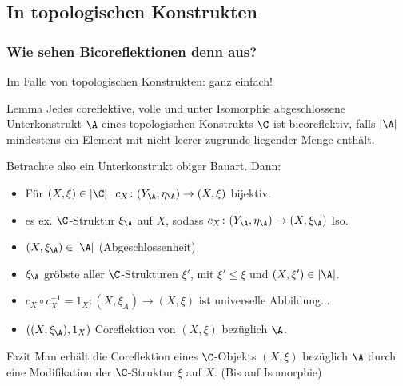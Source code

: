\subsection{In topologischen Konstrukten}

\begin{frame}
\frametitle{Wie sehen Bicoreflektionen denn aus?}

Im Falle von topologischen Konstrukten: ganz einfach!

  \pause

  \begin{block}{Lemma}
  Jedes coreflektive, volle und unter Isomorphie abgeschlossene Unterkonstrukt $\A$ eines topologischen Konstrukts $\C$ ist bicoreflektiv, falls $|\A|$ mindestens ein Element mit nicht leerer zugrunde liegender Menge enthält.
  \end{block}

  \pause
  Betrachte also ein Unterkonstrukt obiger Bauart. Dann:

  \begin{itemize}
    \item<+-> Für $(X, \xi) \in |\C|$: $c_X \colon (Y_\A, \eta_\A) \to (X, \xi)$ bijektiv.
    \item<+-> es ex. $\C$-Struktur $\xi_\A$ auf $X$, sodass $c_X \colon (Y_\A, \eta_\A) \to (X, \xi_\A)$ Iso.

    \item<+-> $(X, \xi_\A) \in |\A|$ (Abgeschlossenheit)
    \item<+-> $\xi_\A$ gröbste aller $\C$-Strukturen $\xi'$, mit $\xi' \leq \xi$ und $(X, \xi') \in |\A|$.

    \item<+->  $c_X \circ c_X^{-1} = 1_X \colon (X,\xi_A) \to (X,\xi)$ ist universelle Abbildung...

    \item<+-> $((X,\xi_\A),1_X)$ Coreflektion von $(X,\xi)$ bez\"uglich $\A$.\qedhere

  \end{itemize}

  \pause

  \begin{block}{Fazit}
    Man erhält die Coreflektion eines  $\C$-Objekts $(X,\xi)$ bezüglich $\A$ durch eine Modifikation der $\C$-Struktur $\xi$ auf $X$. (Bis auf Isomorphie)
  \end{block}

\end{frame}

